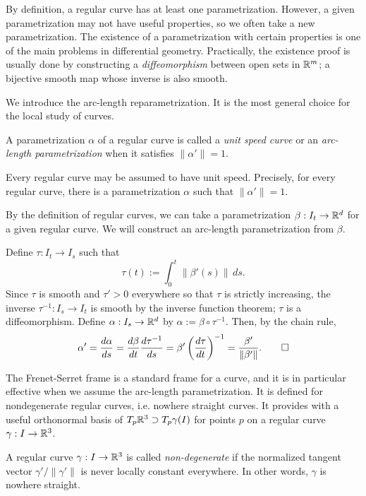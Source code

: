 \documentclass{../../large}
\def\a{\alpha}
\begin{document}
By definition, a regular curve has at least one parametrization.
However, a given parametrization may not have useful properties, so we often take a new parametrization.
The existence of a parametrization with certain properties is one of the main problems in differential geometry.
Practically, the existence proof is usually done by constructing a \emph{diffeomorphism} between open sets in $\mathbb{R}^m$; a bijective smooth map whose inverse is also smooth.

We introduce the arc-length reparametrization.
It is the most general choice for the local study of curves.
\begin{defn}
A parametrization $\a$ of a regular curve is called a \emph{unit speed curve} or an \emph{arc-length parametrization} when it satisfies $\|\a'\|=1$.
\end{defn}
\begin{thm}
Every regular curve may be assumed to have unit speed.
Precisely, for every regular curve, there is a parametrization $\a$ such that $\|\a'\|=1$.
\end{thm}
\begin{pf}
By the definition of regular curves, we can take a parametrization $\beta:I_t\to\mathbb{R}^d$ for a given regular curve.
We will construct an arc-length parametrization from $\beta$.

Define $\tau:I_t\to I_s$ such that
\[\tau(t):=\int_0^t\|\beta'(s)\|\,ds.\]
Since $\tau$ is smooth and $\tau'>0$ everywhere so that $\tau$ is strictly increasing, the inverse $\tau^{-1}:I_s\to I_t$ is smooth by the inverse function theorem; $\tau$ is a diffeomorphism.
Define $\a:I_s\to\R^d$ by $\a:=\beta\circ\tau^{-1}$.
Then, by the chain rule,
\[\a'=\dd{\a}{s}=\dd{\beta}{t}\dd{\tau^{-1}}{s}=\beta'\left(\dd{\tau}{t}\right)^{-1}=\frac{\beta'}{\|\beta'\|}.\qedhere\]
\end{pf}


The Frenet-Serret frame is a standard frame for a curve, and it is in particular effective when we assume the arc-length parametrization.
It is defined for nondegenerate regular curves, i.e. nowhere straight curves.
It provides with a useful orthonormal basis of $T_p\mathbb{R}^3\supset T_p\gamma(I)$ for points $p$ on a regular curve $\gamma:I\to\mathbb{R}^3$.
\begin{prb}
A regular curve $\gamma:I\to\mathbb{R}^3$ is called \emph{non-degenerate} if the normalized tangent vector $\gamma'/\|\gamma'\|$ is never locally constant everywhere.
In other words, $\gamma$ is nowhere straight.
\end{prb}
\end{document}
